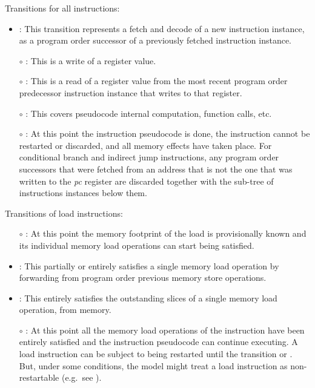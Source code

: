 \noindent Transitions for all instructions:
\begin{itemize}
\item {}: This transition represents a fetch and decode of a new instruction instance, as a program order successor of a previously fetched instruction instance.
\item[$\circ$] : This is a write of a register value.
\item[$\circ$] : This is a read of a register value from the most recent program order predecessor instruction instance that writes to that register.
\item[$\circ$] : This covers pseudocode internal computation, function calls, etc.
\item[$\circ$] : At this point the instruction pseudocode is done, the instruction cannot be restarted or discarded, and all memory effects have taken place.
For conditional branch and indirect jump instructions, any program order successors that were fetched from an address that is not the one that was written to the {\em pc} register are discarded together with the sub-tree of instructions instances below them.
\end{itemize}

\noindent Transitions of load instructions:
\begin{itemize}
\item[$\circ$] : At this point the memory footprint of the load is provisionally known and its individual memory load operations can start being satisfied.
\item {}: This partially or entirely satisfies a single memory load operation by forwarding from program order previous memory store operations.
\item {}: This entirely satisfies the outstanding slices of a single memory load operation, from memory.
\item[$\circ$] : At this point all the memory load operations of the instruction have been entirely satisfied and the instruction pseudocode can continue executing.
A load instruction can be subject to being restarted until the  transition or .
But, under some conditions, the model might treat a load instruction as non-restartable (e.g.~see ).
\end{itemize}

